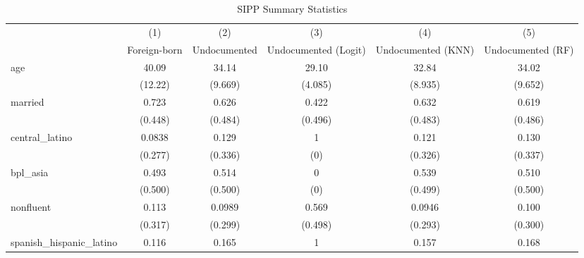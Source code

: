 \begin{table}[htbp]\centering
\def\sym#1{\ifmmode^{#1}\else\(^{#1}\)\fi}
\caption{SIPP Summary Statistics \label{tab:sum}}
\begin{tabular}{l*{5}{c}}
\hline\hline
                    &\multicolumn{1}{c}{(1)}         &\multicolumn{1}{c}{(2)}         &\multicolumn{1}{c}{(3)}         &\multicolumn{1}{c}{(4)}         &\multicolumn{1}{c}{(5)}         \\
                    &Foreign-born         &Undocumented         &Undocumented (Logit)         &Undocumented (KNN)         &Undocumented (RF)         \\
\hline
age                 &       40.09         &       34.14         &       29.10         &       32.84         &       34.02         \\
                    &     (12.22)         &     (9.669)         &     (4.085)         &     (8.935)         &     (9.652)         \\
[1em]
married             &       0.723         &       0.626         &       0.422         &       0.632         &       0.619         \\
                    &     (0.448)         &     (0.484)         &     (0.496)         &     (0.483)         &     (0.486)         \\
[1em]
central\_latino      &      0.0838         &       0.129         &           1         &       0.121         &       0.130         \\
                    &     (0.277)         &     (0.336)         &         (0)         &     (0.326)         &     (0.337)         \\
[1em]
bpl\_asia            &       0.493         &       0.514         &           0         &       0.539         &       0.510         \\
                    &     (0.500)         &     (0.500)         &         (0)         &     (0.499)         &     (0.500)         \\
[1em]
nonfluent           &       0.113         &      0.0989         &       0.569         &      0.0946         &       0.100         \\
                    &     (0.317)         &     (0.299)         &     (0.498)         &     (0.293)         &     (0.300)         \\
[1em]
spanish\_hispanic\_latino&       0.116         &       0.165         &           1         &       0.157         &       0.168         \\

\end{tabular}
\end{table}
